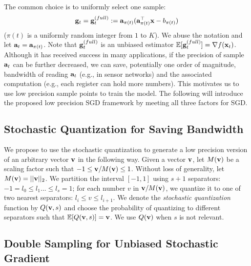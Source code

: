 \documentclass{article}
\def\a{{\bf a}}
\def\g{{\bf g}}
\def\x{{\bf x}}
\def\v{{\bf v}}
\def\E{\mathbb{E}}
\begin{document}
\vspace{-1.5em}
The common choice is to uniformly select one sample:
\vspace{-0.5em}
\begin{align}
\g_t = \g_t^{(full)} := \a_{\pi(t)} (\a_{\pi(t)}^\top \x - b_{\pi(t)})
\label{eq:sgfull}
\end{align} 
($\pi(t)$ is a uniformly random integer from $1$ to $K$). We abuse the notation and let $\a_t = \a_{\pi(t)}$. Note that $\g_t^{(full)}$ is an unbiased estimator $\E [\g_t^{(full)}] = \nabla f(\x_t)$. Although it has received success in many applications, 
if the precision of sample $\a_{t}$ can be further decreased,
we can save, potentially one order of magnitude, bandwidth
of reading $\a_{t}$ (e.g., in sensor networks) and the associated computation (e.g.,
each register can hold more numbers). 
This motivates us to use low precision sample points to train the model. The following will introduce the proposed low precision SGD framework by meeting all three factors for SGD.

\vspace{-0.5em}
\subsection{Stochastic Quantization for Saving Bandwidth} 
\vspace{-0.5em}

We propose to use the stochastic quantization to generate a low precision version of an arbitrary vector $\v$ in the following 
way. Given a vector
$\v$, let $M(\v)$ be a scaling factor such that $-1 \le \v/M(\v) \le 1$. Without loss of generality, let $M(\v)=||\v||_2$. We partition the interval $[-1, 1]$ using $s+1$ separators: $-1 = l_0 \le l_1 ... \le l_{s} = 1$; for each number $v$ in $\v/M(\v)$, we 
quantize it to one of two nearest separators: $l_i \le v \le l_{i+1}$. We denote the \emph{stochastic quantization} function by $Q(\v, s)$ and choose the probability of quantizing to different separators such that $\E[Q(\v, s)] = \v$. We use $Q(\v)$ when $s$ is not relevant.

\vspace{-0.5em}
\subsection{Double Sampling for Unbiased Stochastic Gradient}
\vspace{-0.5em}
\end{document}
